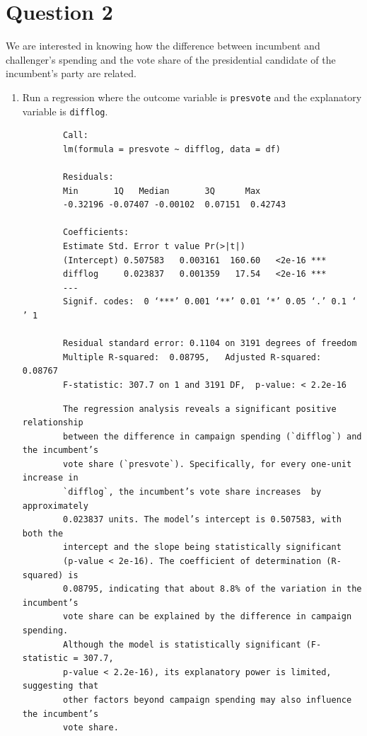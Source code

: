 \documentclass[12pt,letterpaper]{article}
\begin{document}
\newpage

\section*{Question 2}
\noindent We are interested in knowing how the difference between incumbent and challenger's spending and the vote share of the presidential candidate of the incumbent's party are related.	\vspace{.25cm}
	\begin{enumerate}
		\item Run a regression where the outcome variable is \texttt{presvote} and the explanatory variable is \texttt{difflog}.	
		  
		\begin{verbatim}
		Call:
		lm(formula = presvote ~ difflog, data = df)
		
		Residuals:
		Min       1Q   Median       3Q      Max 
		-0.32196 -0.07407 -0.00102  0.07151  0.42743 
		
		Coefficients:
		Estimate Std. Error t value Pr(>|t|)    
		(Intercept) 0.507583   0.003161  160.60   <2e-16 ***
		difflog     0.023837   0.001359   17.54   <2e-16 ***
		---
		Signif. codes:  0 ‘***’ 0.001 ‘**’ 0.01 ‘*’ 0.05 ‘.’ 0.1 ‘ ’ 1
		
		Residual standard error: 0.1104 on 3191 degrees of freedom
		Multiple R-squared:  0.08795,	Adjusted R-squared:  0.08767 
		F-statistic: 307.7 on 1 and 3191 DF,  p-value: < 2.2e-16
		\end{verbatim}	\begin{verbatim}
		The regression analysis reveals a significant positive relationship 
		between the difference in campaign spending (`difflog`) and the incumbent’s 
		vote share (`presvote`). Specifically, for every one-unit increase in    
		`difflog`, the incumbent’s vote share increases  by approximately 
		0.023837 units. The model’s intercept is 0.507583, with both the
		intercept and the slope being statistically significant 
		(p-value < 2e-16). The coefficient of determination (R-squared) is
		0.08795, indicating that about 8.8% of the variation in the incumbent’s
		vote share can be explained by the difference in campaign spending.
		Although the model is statistically significant (F-statistic = 307.7, 
		p-value < 2.2e-16), its explanatory power is limited, suggesting that 
		other factors beyond campaign spending may also influence the incumbent’s 
		vote share.
		\end{verbatim}	
		

\end{enumerate}
\end{document}
